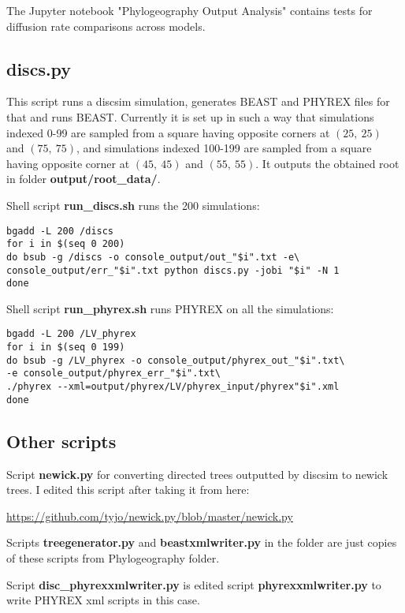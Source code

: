 The Jupyter notebook "Phylogeography Output Analysis" contains tests for diffusion rate comparisons across models.



\subsection*{discs.py}

This script runs a discsim simulation, generates BEAST and PHYREX files for that and runs BEAST.
Currently it is set up in such a way that simulations indexed 0-99 are sampled from a square having opposite corners at $(25,\ 25)$ and $(75,\ 75)$, and simulations indexed 100-199 are sampled from a square having opposite corner at $(45,\ 45)$ and $(55,\ 55)$. It outputs the obtained root in folder \textbf{output/root\_data/}.



Shell script \textbf{run\_discs.sh} runs the 200 simulations:

\begin{verbatim}
bgadd -L 200 /discs
for i in $(seq 0 200)
do bsub -g /discs -o console_output/out_"$i".txt -e\
console_output/err_"$i".txt python discs.py -jobi "$i" -N 1
done
\end{verbatim}

Shell script \textbf{run\_phyrex.sh} runs PHYREX on all the simulations:

\begin{verbatim}
bgadd -L 200 /LV_phyrex
for i in $(seq 0 199)
do bsub -g /LV_phyrex -o console_output/phyrex_out_"$i".txt\
-e console_output/phyrex_err_"$i".txt\
./phyrex --xml=output/phyrex/LV/phyrex_input/phyrex"$i".xml
done  
\end{verbatim}



\subsection*{Other scripts}

Script \textbf{newick.py} for converting directed trees outputted by discsim to newick trees.
I edited this script after taking it from here:

\url{https://github.com/tyjo/newick.py/blob/master/newick.py}

Scripts \textbf{treegenerator.py} and \textbf{beastxmlwriter.py} in the folder are just copies of these scripts from Phylogeography folder.

Script \textbf{disc\_phyrexxmlwriter.py} is edited script \textbf{phyrexxmlwriter.py} to write  PHYREX xml scripts in this case.



\clearpage





